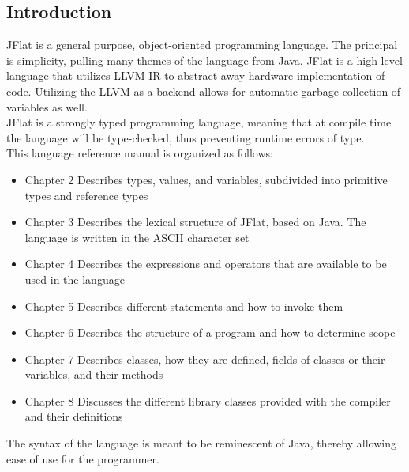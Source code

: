 \begin{homeworkProblem}
	\chapter{Introduction}
	JFlat is a general purpose, object-oriented programming language. The principal is simplicity, pulling many themes of the language from Java. JFlat is a high level language that utilizes LLVM IR to abstract away hardware implementation of code. Utilizing the LLVM as a backend allows for automatic garbage collection of variables as well. \\
	JFlat is a strongly typed programming language, meaning that at compile time the language will be type-checked, thus preventing runtime errors of type. \\
	This language reference manual is organized as follows:\\
	\begin{itemize}
		\item Chapter 2 Describes types, values, and variables, subdivided into primitive types and reference types
		\item Chapter 3 Describes the lexical structure of JFlat, based on Java. The language is written in the ASCII character set
		\item Chapter 4 Describes the expressions and operators that are available to be used in the language
		\item Chapter 5 Describes different statements and how to invoke them
		\item Chapter 6 Describes the structure of a program and how to determine scope
		\item Chapter 7 Describes classes, how they are defined, fields of classes or their variables, and their methods
		\item Chapter 8 Discusses the different library classes provided with the compiler and their definitions
	\end{itemize}
	The syntax of the language is meant to be reminescent of Java, thereby allowing ease of use for the programmer. 
\end{homeworkProblem}
